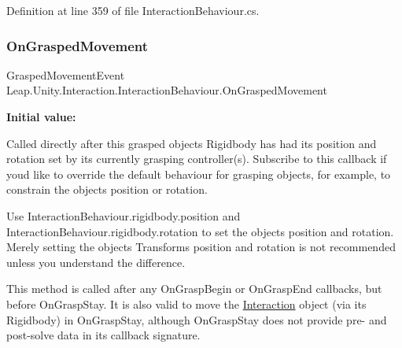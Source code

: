 Definition at line 359 of file Interaction\+Behaviour.\+cs.

\mbox{\label{class_leap_1_1_unity_1_1_interaction_1_1_interaction_behaviour_aac5b0f2f21a26369d70314363e18af3f}} 
\subsubsection{\texorpdfstring{OnGraspedMovement}{OnGraspedMovement}}
{\footnotesize\ttfamily Grasped\+Movement\+Event Leap.\+Unity.\+Interaction.\+Interaction\+Behaviour.\+On\+Grasped\+Movement}

{\bfseries Initial value\+:}
\begin{DoxyCode}{0}

\end{DoxyCode}


Called directly after this grasped object\textquotesingle{}s Rigidbody has had its position and rotation set by its currently grasping controller(s). Subscribe to this callback if you\textquotesingle{}d like to override the default behaviour for grasping objects, for example, to constrain the object\textquotesingle{}s position or rotation. 

Use Interaction\+Behaviour.\+rigidbody.\+position and Interaction\+Behaviour.\+rigidbody.\+rotation to set the object\textquotesingle{}s position and rotation. Merely setting the object\textquotesingle{}s Transform\textquotesingle{}s position and rotation is not recommended unless you understand the difference. 

This method is called after any On\+Grasp\+Begin or On\+Grasp\+End callbacks, but before On\+Grasp\+Stay. It is also valid to move the \mbox{\hyperlink{namespace_leap_1_1_unity_1_1_interaction}{Interaction}} object (via its Rigidbody) in On\+Grasp\+Stay, although On\+Grasp\+Stay does not provide pre-\/ and post-\/solve data in its callback signature. 


